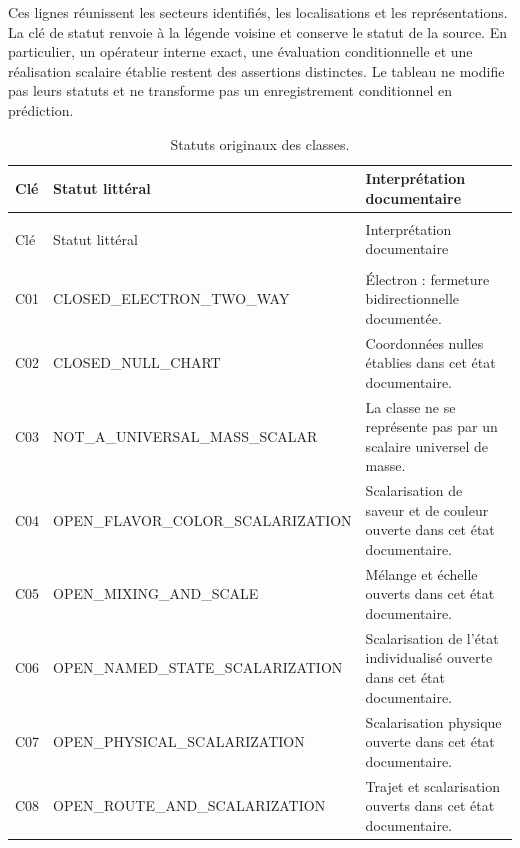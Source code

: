 Ces lignes réunissent les secteurs identifiés, les localisations et les
représentations. La clé de statut renvoie à la légende voisine et conserve
le statut de la source. En particulier, un opérateur interne exact, une
évaluation conditionnelle et une réalisation scalaire établie restent des
assertions distinctes. Le tableau ne modifie pas leurs statuts et ne transforme
pas un enregistrement conditionnel en prédiction.

\begingroup
\setlength{\tabcolsep}{4pt}
\setlength{\extrarowheight}{4pt}
\renewcommand{\arraystretch}{1.13}
\begin{longtable}{@{}>{\raggedright\arraybackslash}p{}>{\raggedright\arraybackslash}p{}>{\raggedright\arraybackslash}p{}@{}}
\caption{Statuts originaux des classes.}\label{tab:vi-estados-clases}\\
\toprule
Clé & Statut littéral & Interprétation documentaire \\
\midrule
\endfirsthead
\multicolumn{3}{l}{\textit{Suite}}\\
\toprule
Clé & Statut littéral & Interprétation documentaire \\
\midrule
\endhead
\midrule
\multicolumn{3}{r}{Suite à la page suivante}\\
\endfoot
\bottomrule
\endlastfoot
C01 & CLOSED\_\allowbreak{}ELECTRON\_\allowbreak{}TWO\_\allowbreak{}WAY & Électron : fermeture bidirectionnelle documentée. \\
C02 & CLOSED\_\allowbreak{}NULL\_\allowbreak{}CHART & Coordonnées nulles établies dans cet état documentaire. \\
C03 & NOT\_\allowbreak{}A\_\allowbreak{}UNIVERSAL\_\allowbreak{}MASS\_\allowbreak{}SCALAR & La classe ne se représente pas par un scalaire universel de masse. \\
C04 & OPEN\_\allowbreak{}FLAVOR\_\allowbreak{}COLOR\_\allowbreak{}SCALARIZATION & Scalarisation de saveur et de couleur ouverte dans cet état documentaire. \\
C05 & OPEN\_\allowbreak{}MIXING\_\allowbreak{}AND\_\allowbreak{}SCALE & Mélange et échelle ouverts dans cet état documentaire. \\
C06 & OPEN\_\allowbreak{}NAMED\_\allowbreak{}STATE\_\allowbreak{}SCALARIZATION & Scalarisation de l’état individualisé ouverte dans cet état documentaire. \\
C07 & OPEN\_\allowbreak{}PHYSICAL\_\allowbreak{}SCALARIZATION & Scalarisation physique ouverte dans cet état documentaire. \\
C08 & OPEN\_\allowbreak{}ROUTE\_\allowbreak{}AND\_\allowbreak{}SCALARIZATION & Trajet et scalarisation ouverts dans cet état documentaire. \\
\end{longtable}
\endgroup


